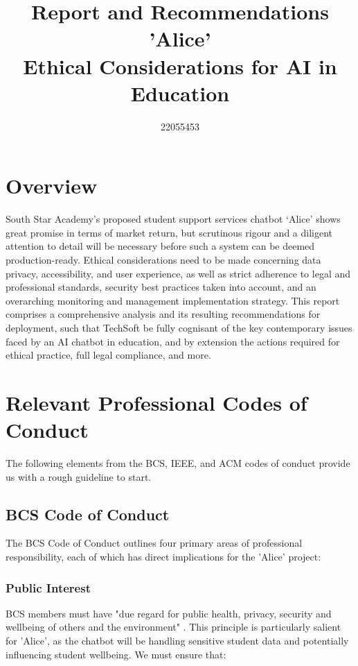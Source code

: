 \documentclass[15pt,a4paper]{article}
\title{Report and Recommendations\\ 'Alice' \\ Ethical Considerations for AI in Education}
\author{22055453}
\date{}
\begin{document}
\maketitle

\tableofcontents

\newpage

\begin{multicols}{2}
\section{Overview}
South Star Academy's proposed student support services chatbot `Alice' shows great promise in terms of market return, but scrutinous rigour and a diligent attention to detail will be necessary before such a system can be deemed production-ready. Ethical considerations need to be made concerning data privacy, accessibility, and user experience, as well as strict adherence to legal and professional standards, security best practices taken into account, and an overarching monitoring and management implementation strategy. This report comprises a comprehensive analysis and its resulting recommendations for deployment, such that TechSoft be fully cognisant of the key contemporary issues faced by an AI chatbot in education, and by extension the actions required for ethical practice, full legal compliance, and more.

\section{Relevant Professional Codes of Conduct}

The following elements from the BCS, IEEE, and ACM codes of conduct provide us with a rough guideline to start.

\subsection{BCS Code of Conduct}

The BCS Code of Conduct \textit{\parencite[p. 1]{BCS2024}} outlines four primary areas of professional responsibility, each of which has direct implications for the 'Alice' project:

\subsubsection*{Public Interest}
BCS members must have "due regard for public health, privacy, security and wellbeing of others and the environment" \textit{\parencite[p. 2]{BCS2024}}. This principle is particularly salient for 'Alice', as the chatbot will be handling sensitive student data and potentially influencing student wellbeing. We must ensure that:


\end{multicols}
\end{document}
